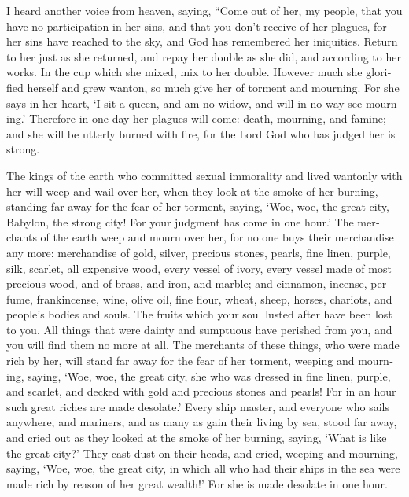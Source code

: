 \begin{paracol}{2}
\begin{otherlanguage}{english}
 I heard another voice from heaven, saying, ``Come out of
her, my people, that you have no participation in her sins, and that you
don't receive of her plagues,  for her sins have reached
to the sky, and God has remembered her iniquities.  Return
to her just as she returned, and repay her double as she did, and
according to her works. In the cup which she mixed, mix to her double.
 However much she glorified herself and grew wanton, so
much give her of torment and mourning. For she says in her heart, `I sit
a queen, and am no widow, and will in no way see mourning.'
 Therefore in one day her plagues will come: death,
mourning, and famine; and she will be utterly burned with fire, for the
Lord God who has judged her is strong.

 The kings of the earth who committed sexual immorality
and lived wantonly with her will weep and wail over her, when they look
at the smoke of her burning,  standing far away for the
fear of her torment, saying, `Woe, woe, the great city, Babylon, the
strong city! For your judgment has come in one hour.' 
The merchants of the earth weep and mourn over her, for no one buys
their merchandise any more:  merchandise of gold, silver,
precious stones, pearls, fine linen, purple, silk, scarlet, all
expensive wood, every vessel of ivory, every vessel made of most
precious wood, and of brass, and iron, and marble;  and
cinnamon, incense, perfume, frankincense, wine, olive oil, fine flour,
wheat, sheep, horses, chariots, and people's bodies and souls.
 The fruits which your soul lusted after have been lost
to you. All things that were dainty and sumptuous have perished from
you, and you will find them no more at all.  The
merchants of these things, who were made rich by her, will stand far
away for the fear of her torment, weeping and mourning, 
saying, `Woe, woe, the great city, she who was dressed in fine linen,
purple, and scarlet, and decked with gold and precious stones and
pearls!  For in an hour such great riches are made
desolate.' Every ship master, and everyone who sails anywhere, and
mariners, and as many as gain their living by sea, stood far away,
 and cried out as they looked at the smoke of her
burning, saying, `What is like the great city?'  They
cast dust on their heads, and cried, weeping and mourning, saying, `Woe,
woe, the great city, in which all who had their ships in the sea were
made rich by reason of her great wealth!' For she is made desolate in
one hour.


\end{otherlanguage}
\end{paracol}
